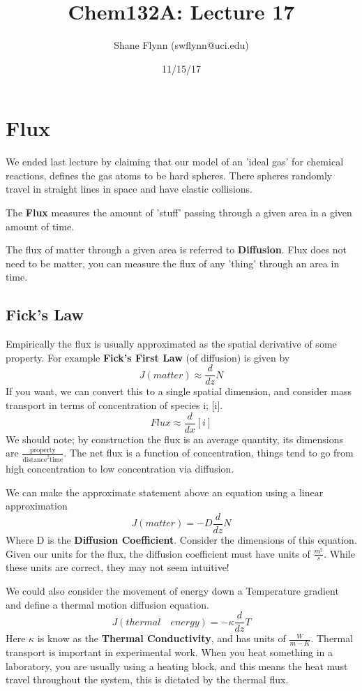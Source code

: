 \documentclass{article}
\title{Chem132A: Lecture 17}
\author{Shane Flynn (swflynn@uci.edu)}
\date{11/15/17}
\newcommand{\be}{\begin{equation}}
\newcommand{\ee}{\end{equation}}
\begin{document}
\maketitle

\section*{Flux}
We ended last lecture by claiming that our model of an 'ideal gas' for chemical reactions, defines the gas atoms to be hard spheres.
There spheres randomly travel in straight lines in space and have elastic collisions. 

The \textbf{Flux} measures the amount of 'stuff' passing through a given area in a given amount of time. 

The flux of matter through a given area is referred to \textbf{Diffusion}.
Flux does not need to be matter, you can measure the flux of any 'thing' through an area in time.

\subsection*{Fick's Law}
Empirically the flux is usually approximated as the spatial derivative of some property.
For example \textbf{Fick's First Law} (of diffusion) is given by
\be
J(matter) \approx \frac{d}{dz}N
\ee
If you want, we can convert this to  a single spatial dimension, and consider mass transport in terms of concentration of species i; [i].
\be
Flux \approx \frac{d}{dx}[i]
\ee
We should note; by construction the flux is an average quantity, its dimensions are $\frac{\text{property}}{\text{distance}^2 \text{time}}$. 
The net flux is a function of concentration, things tend to go from high concentration to low concentration via diffusion. 

We can make the approximate statement above an equation using a linear approximation 
\be
J(matter) = -D\frac{d}{dz}N
\ee
Where D is the \textbf{Diffusion Coefficient}.
Consider the dimensions of this equation.
Given our units for the flux, the diffusion coefficient must have units of $\frac{m^2}{s}$.
While these units are correct, they may not seem intuitive!

We could also consider the movement of energy down a Temperature gradient and define a thermal motion diffusion equation. 
\be
J(thermal \quad energy) = -\kappa \frac{d}{dz}T
\ee
Here $\kappa$ is know as the \textbf{Thermal Conductivity}, and has units of $\frac{W}{m-K}$. 
Thermal transport is important in experimental work.
When you heat something in a laboratory, you are usually using a heating block, and this means the heat must travel throughout the system, this is dictated by the thermal flux. 
\end{document}
